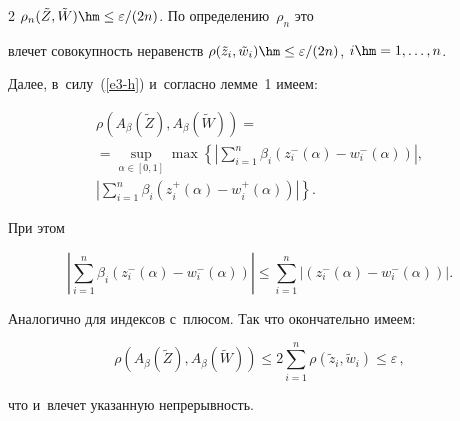 \begin{multicols}{2}
$\rho_n(\tilde{Z}, \tilde{W})\hm\leq \varepsilon/(2n)$. По определению~$\rho_n$ это 


влечет совокупность неравенств $\rho(\tilde{z}_i, \tilde{w}_i)\hm\leq 


\varepsilon/(2n)$, $i\hm=1,\ldots,n$.





Далее, в~силу~(\ref{e3-h}) и~согласно лемме~1 имеем:


\begin{multline*}


\rho\left(A_{\beta}\left(\tilde{Z}\right), A_{\beta}\left(\tilde{W}\right)\right) = {}\\


{}=\sup\limits_{\alpha\in 


[0,1]}\max\left\{ \left\vert \sum\limits_{i=1}^n\beta_i(z^{-}_i(\alpha)-w^{-}_i(\alpha))\right\vert, \right.\\


\left.


\left\vert \sum\limits_{i=1}^n\beta_i(z^{+}_i(\alpha)-w^{+}_i(\alpha))\right\vert


\right\}.


\end{multline*}


При этом





\noindent


$$


\left\vert \sum\limits_{i=1}^n \beta_i\left(z^{-}_i(\alpha)-w^{-}_i(\alpha)\right)\right\vert \leq 


\sum\limits_{i=1}^n \left\vert \left(z^{-}_i(\alpha)-w^{-}_i(\alpha)\right)\right\vert.


$$


Аналогично для индексов с~плюсом. Так что окончательно имеем:





\noindent


$$


\rho\left(A_{\beta}(\tilde{Z}), A_{\beta}(\tilde{W})\right)\leq 2\sum\limits_{i=1}^n\rho


\left(\tilde{z}_i, \tilde{w}_i\right)\leq\varepsilon\,,


$$


что и~влечет указанную непрерывность.






\end{multicols}
